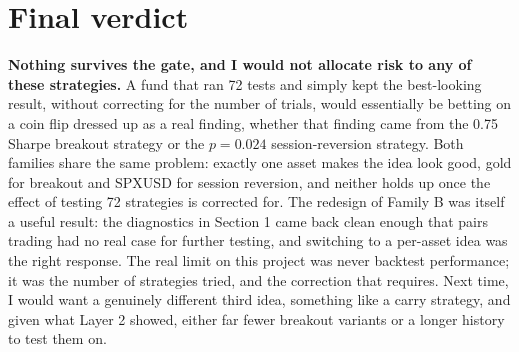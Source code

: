 \documentclass[11pt]{article}
\begin{document}
\section{Final verdict}
\textbf{Nothing survives the gate, and I would not allocate risk to any of these strategies.} A fund that ran 72
tests and simply kept the best-looking result, without correcting for the number of trials, would essentially be
betting on a coin flip dressed up as a real finding, whether that finding came from the 0.75 Sharpe breakout
strategy or the $p=0.024$ session-reversion strategy. Both families share the same problem: exactly one asset makes
the idea look good, gold for breakout and SPXUSD for session reversion, and neither holds up once the effect of
testing 72 strategies is corrected for. The redesign of Family B was itself a useful result: the diagnostics in
Section 1 came back clean enough that pairs trading had no real case for further testing, and switching to a
per-asset idea was the right response. The real limit on this project was never backtest performance; it was the
number of strategies tried, and the correction that requires. Next time, I would want a genuinely different third
idea, something like a carry strategy, and given what Layer 2 showed, either far fewer breakout variants or a longer
history to test them on.
\end{document}
